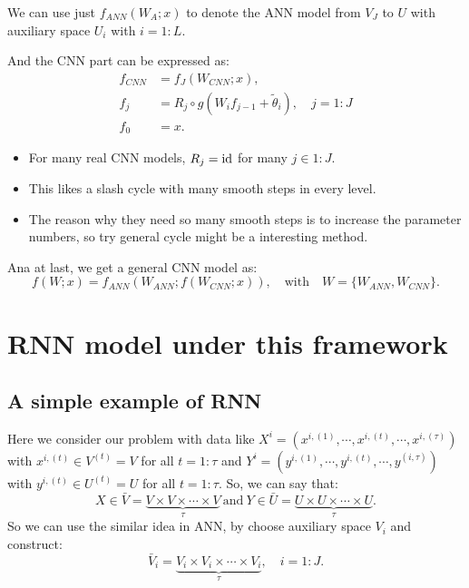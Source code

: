 We can use just $f_{ANN}(W_A; x)$ to denote the ANN model from $V_J$ to $U$ with auxiliary space $U_i$ with $i = 1:L$.

And the CNN part can be expressed as:
\begin{align}
f_{CNN} &= f_J(W_{CNN};x), \\
f_j &= R_j \circ g(W_i f_{j-1} + \tilde{\theta}_i), \quad j = 1:J \\
f_0 &= x.
\end{align}
\begin{itemize}
\item For many real CNN models, $R_j = \rm{id}$ for many $j \in 1:J$. 
\item This likes a slash cycle with many smooth steps in every level.
\item The reason why they need so many smooth steps is to increase the parameter numbers, so try general cycle might be a interesting method.
\end{itemize}

Ana at last, we get a general CNN model as:
\begin{equation}
f(W;x) = f_{ANN}(W_{ANN}; f(W_{CNN};x)), \quad \text{with} \quad W = \{W_{ANN}, W_{CNN}\}.
\end{equation}



\section{RNN model under this framework}
\subsection{A simple example of RNN}
Here we consider our problem with data like $X^i = (x^{i,(1)}, \cdots, x^{i,(t)}, \cdots, x^{i,(\tau)})$ with $x^{i,(t)} \in V^{(t)} = V$ for all $t = 1:\tau$ and $Y^i = (y^{i,(1)}, \cdots, y^{i,(t)}, \cdots, y^{(i,\tau)})$ with $y^{i,(t)} \in U^{(t)} = U$ for all $t = 1:\tau$. So, we can say that:
\begin{equation}
X \in \bar{V} = \underbrace{V\times V \times\cdots \times V }_{\tau} ~\text{and}~ Y \in \bar{U} =  \underbrace{U\times U \times\cdots \times U }_{\tau}.
\end{equation}
So we can use the similar idea in ANN, by choose auxiliary space $V_i$ and construct:
\begin{equation}
\bar{V}_i = \underbrace{V_i \times V_i \times \cdots \times V_i}_{\tau}, \quad i = 1:J.
\end{equation}

